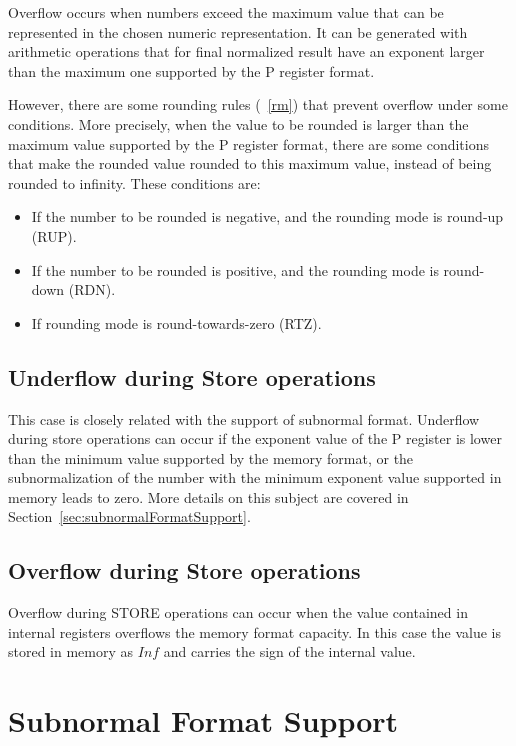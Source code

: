 Overflow occurs when numbers exceed the maximum value that can be represented in the chosen numeric representation.
It can be generated with arithmetic operations that for final normalized result have an exponent larger than the maximum one supported by the P register format.

However, there are some rounding rules (\figurename~\ref{rm}) that prevent overflow under some conditions.
More precisely, when the value to be rounded is larger than the maximum value supported by the P register format, there are some conditions that make the rounded value rounded to this maximum value, instead of being rounded to infinity.
These conditions are:
\begin{itemize}
    \item If the number to be rounded is negative, and the rounding mode is round-up (RUP).
    \item If the number to be rounded is positive, and the rounding mode is round-down (RDN).
    \item If rounding mode is round-towards-zero (RTZ).
\end{itemize}

\subsection{Underflow during Store operations}

This case is closely related with the support of subnormal format.
Underflow during store operations can occur if the exponent value of the P register is lower than the minimum value supported by the memory format, or the subnormalization of the number with the minimum exponent value supported in memory leads to zero.
More details on this subject are covered in Section~\ref{sec:subnormalFormatSupport}.

\subsection{Overflow during Store operations}

Overflow during STORE operations can occur when the value contained in internal registers overflows the memory format capacity.
In this case the value is stored in memory as $Inf$ and carries the sign of the internal value.

\section{Subnormal Format Support}

